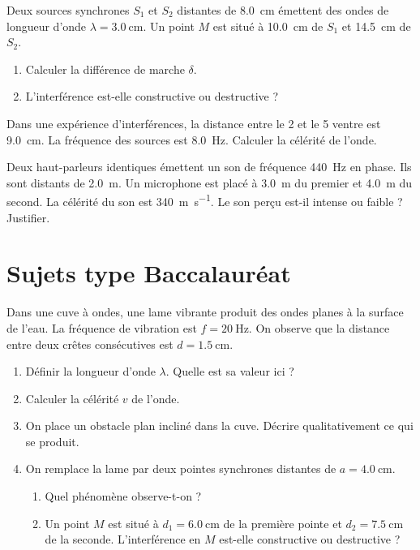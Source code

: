 \exo{} Deux sources synchrones $S_1$ et $S_2$ distantes de \SI{8.0}{\centi\metre} émettent des ondes de longueur d'onde $\lambda = \SI{3.0}{\centi\metre}$. Un point $M$ est situé à \SI{10.0}{\centi\metre} de $S_1$ et \SI{14.5}{\centi\metre} de $S_2$. 
\begin{enumerate}
    \item Calculer la différence de marche $\delta$.
    \item L'interférence est-elle constructive ou destructive ?
\end{enumerate}

\exo{} Dans une expérience d'interférences, la distance entre le 2\ieme{} et le 5\ieme{} ventre est \SI{9.0}{\centi\metre}. La fréquence des sources est \SI{8.0}{\hertz}. Calculer la célérité de l'onde.

\exo{} Deux haut-parleurs identiques émettent un son de fréquence \SI{440}{\hertz} en phase. Ils sont distants de \SI{2.0}{\metre}. Un microphone est placé à \SI{3.0}{\metre} du premier et \SI{4.0}{\metre} du second. La célérité du son est \SI{340}{\metre\per\second}. Le son perçu est-il intense ou faible ? Justifier.

\section{Sujets type Baccalauréat}


Dans une cuve à ondes, une lame vibrante produit des ondes planes à la surface de l'eau. La fréquence de vibration est $f = \SI{20}{\hertz}$. On observe que la distance entre deux crêtes consécutives est $d = \SI{1.5}{\centi\metre}$.

\begin{enumerate}
    \item Définir la longueur d'onde $\lambda$. Quelle est sa valeur ici ?
    \item Calculer la célérité $v$ de l'onde.
    \item On place un obstacle plan incliné dans la cuve. Décrire qualitativement ce qui se produit.
    \item On remplace la lame par deux pointes synchrones distantes de $a = \SI{4.0}{\centi\metre}$. 
    \begin{enumerate}
        \item Quel phénomène observe-t-on ?
        \item Un point $M$ est situé à $d_1 = \SI{6.0}{\centi\metre}$ de la première pointe et $d_2 = \SI{7.5}{\centi\metre}$ de la seconde. L'interférence en $M$ est-elle constructive ou destructive ?
    \end{enumerate}
\end{enumerate}

